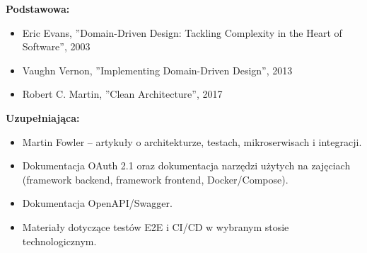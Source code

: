 \documentclass[12pt, a4paper]{article}
\begin{document}
\textbf{Podstawowa:}
\begin{itemize}
  \item Eric Evans, ''Domain-Driven Design: Tackling Complexity in the Heart of Software'', 2003
  \item Vaughn Vernon, ''Implementing Domain-Driven Design'', 2013
  \item Robert C. Martin, ''Clean Architecture'', 2017
\end{itemize}

\textbf{Uzupełniająca:}
\begin{itemize}
  \item Martin Fowler – artykuły o architekturze, testach, mikroserwisach i integracji.
  \item Dokumentacja OAuth 2.1 oraz dokumentacja narzędzi użytych na zajęciach (framework backend, framework frontend, Docker/Compose).
  \item Dokumentacja OpenAPI/Swagger.
  \item Materiały dotyczące testów E2E i CI/CD w wybranym stosie technologicznym.
\end{itemize}
\end{document}
